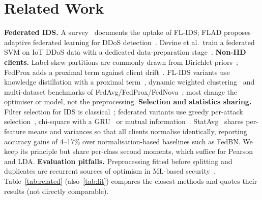 \section{Related Work}\label{sec:related}
\textbf{Federated IDS.} A survey~\cite{agrawal2022} documents the uptake of FL-IDS; FLAD proposes adaptive federated learning for DDoS detection~\cite{doriguzzi2024}. Devine et al.\ train a federated SVM on IoT DDoS data with a dedicated data-preparation stage~\cite{devine2025}.
\textbf{Non-IID clients.} Label-skew partitions are commonly drawn from Dirichlet priors~\cite{hsu2019}; FedProx adds a proximal term against client drift~\cite{li2020fedprox}. FL-IDS variants use knowledge distillation with a proximal term~\cite{fdids2025}, dynamic weighted clustering~\cite{fedDWC2025} and multi-dataset benchmarks of FedAvg/FedProx/FedNova~\cite{datasetcentric2026}; most change the optimiser or model, not the preprocessing.
\textbf{Selection and statistics sharing.} Filter selection for IDS is classical~\cite{ambusaidi2016}; federated variants use greedy per-attack selection~\cite{yang2021}, chi-square with a GRU~\cite{nguyen2026} or mutual information~\cite{fdids2025}. StatAvg~\cite{bouzinis2025} shares per-feature means and variances so that all clients normalise identically, reporting accuracy gains of 4--17\% over normalisation-based baselines such as FedBN. We keep its principle but share per-class second moments, which suffice for Pearson and LDA.
\textbf{Evaluation pitfalls.} Preprocessing fitted before splitting and duplicates are recurrent sources of optimism in ML-based security~\cite{arp2022,kapoor2023}. Table~\ref{tab:related} (also~\ref{tab:lit}) compares the closest methods and quotes their results (not directly comparable).


